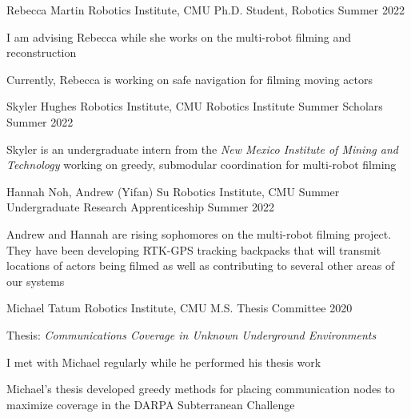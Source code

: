 
\begin{cventries}
  \cventry
  {Rebecca Martin}
  {Robotics Institute, CMU}
  {Ph.D. Student, Robotics}
  {Summer 2022}
  {
    \begin{cvitems}
      \item I am advising Rebecca while she works on the multi-robot filming and
        reconstruction
      \item Currently, Rebecca is working on safe navigation for filming moving
        actors
    \end{cvitems}
  }
  \cventry
  {Skyler Hughes}
  {Robotics Institute, CMU}
  {Robotics Institute Summer Scholars}
  {Summer 2022}
  {
    \begin{cvitems}
      \item Skyler is an undergraduate intern from the
        \emph{New Mexico Institute of Mining and Technology}
        working on greedy, submodular coordination for multi-robot filming
    \end{cvitems}
  }
  \cventry
  {Hannah Noh, Andrew (Yifan) Su}
  {Robotics Institute, CMU}
  {Summer Undergraduate Research Apprenticeship}
  {Summer 2022}
  {
    \begin{cvitems}
    \item Andrew and Hannah are rising sophomores on the multi-robot filming
      project.
      They have been developing RTK-GPS tracking backpacks that will transmit
      locations of actors being filmed as well as contributing to several other
      areas of our systems
    \end{cvitems}
  }
  \cventry
  {Michael Tatum}
  {Robotics Institute, CMU}
  {M.S. Thesis Committee}
  {2020}
  {
    \begin{cvitems}
      \item Thesis: \emph{Communications Coverage in Unknown Underground Environments}
      \item I met with Michael regularly while he performed his thesis work
      \item Michael's thesis developed greedy methods for placing communication
        nodes to maximize coverage in the DARPA Subterranean Challenge
    \end{cvitems}
  }
\end{cventries}
